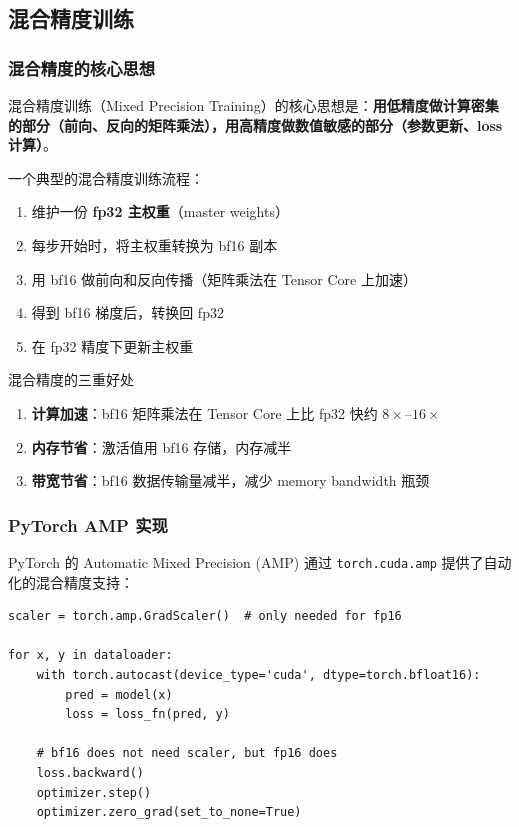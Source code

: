 \subsection{混合精度训练}

\subsubsection{混合精度的核心思想}

混合精度训练（Mixed Precision Training）的核心思想是：\textbf{用低精度做计算密集的部分（前向、反向的矩阵乘法），用高精度做数值敏感的部分（参数更新、loss 计算）}。

一个典型的混合精度训练流程：
\begin{enumerate}
    \item 维护一份 \textbf{fp32 主权重}（master weights）
    \item 每步开始时，将主权重转换为 bf16 副本
    \item 用 bf16 做前向和反向传播（矩阵乘法在 Tensor Core 上加速）
    \item 得到 bf16 梯度后，转换回 fp32
    \item 在 fp32 精度下更新主权重
\end{enumerate}

\begin{importantbox}{混合精度的三重好处}
\begin{enumerate}
    \item \textbf{计算加速}：bf16 矩阵乘法在 Tensor Core 上比 fp32 快约 $8\times$--$16\times$
    \item \textbf{内存节省}：激活值用 bf16 存储，内存减半
    \item \textbf{带宽节省}：bf16 数据传输量减半，减少 memory bandwidth 瓶颈
\end{enumerate}
\end{importantbox}

\subsubsection{PyTorch AMP 实现}

PyTorch 的 Automatic Mixed Precision (AMP) 通过 \texttt{torch.cuda.amp} 提供了自动化的混合精度支持：

\begin{lstlisting}[caption={使用 PyTorch AMP 的训练循环}]
scaler = torch.amp.GradScaler()  # only needed for fp16

for x, y in dataloader:
    with torch.autocast(device_type='cuda', dtype=torch.bfloat16):
        pred = model(x)
        loss = loss_fn(pred, y)

    # bf16 does not need scaler, but fp16 does
    loss.backward()
    optimizer.step()
    optimizer.zero_grad(set_to_none=True)
\end{lstlisting}

